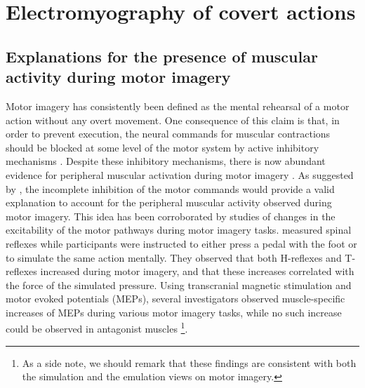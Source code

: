 \documentclass[a4paper,11pt,oneside,oldfontcommands]{memoir}
\let\rmarkdownfootnote\footnote%
\def\footnote{\protect\rmarkdownfootnote}
\begin{document}
\section{Electromyography of covert actions}\label{emg}

\subsection{Explanations for the presence of muscular activity during
motor
imagery}\label{explanations-for-the-presence-of-muscular-activity-during-motor-imagery}

Motor imagery has consistently been defined as the mental rehearsal of a
motor action without any overt movement. One consequence of this claim
is that, in order to prevent execution, the neural commands for muscular
contractions should be blocked at some level of the motor system by
active inhibitory mechanisms \citep[for a review,
see][]{guillot_imagining_2012}. Despite these inhibitory mechanisms,
there is now abundant evidence for peripheral muscular activation during
motor imagery \citep[for a review,
see][]{guillot_contribution_2005, guillot_imagining_2012}. As suggested
by \citet{jeannerod_representing_1994}, the incomplete inhibition of the
motor commands would provide a valid explanation to account for the
peripheral muscular activity observed during motor imagery. This idea
has been corroborated by studies of changes in the excitability of the
motor pathways during motor imagery tasks. \citet{bonnet_mental_1997}
measured spinal reflexes while participants were instructed to either
press a pedal with the foot or to simulate the same action mentally.
They observed that both H-reflexes and T-reflexes increased during motor
imagery, and that these increases correlated with the force of the
simulated pressure. Using transcranial magnetic stimulation and motor
evoked potentials (MEPs), several investigators observed muscle-specific
increases of MEPs during various motor imagery tasks, while no such
increase could be observed in antagonist muscles
\citep[e.g.,][]{fadiga_corticospinal_1999, rossini_corticospinal_1999}\footnote{As
  a side note, we should remark that these findings are consistent with
  both the simulation and the emulation views on motor imagery.}.
\end{document}
